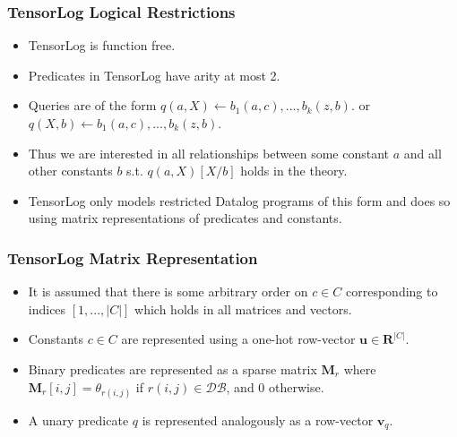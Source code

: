 \documentclass{beamer}
\begin{document}
\begin{frame}
\frametitle{TensorLog Logical Restrictions}
\begin{itemize}
	\item TensorLog is function free.
	\item Predicates in TensorLog have arity at most 2.
	\item Queries are of the form $q(a, X) \leftarrow b_1(a, c), ..., b_k(z, b).$ or $q(X, b) \leftarrow b_1(a, c), ..., b_k(z, b).$
	\item Thus we are interested in all relationships between some constant $a$ and all other constants $b$ s.t. $q(a, X)[X/b]$ holds in the theory.
	\item TensorLog only models restricted Datalog programs of this form and does so using matrix representations of predicates and constants.
\end{itemize}
\end{frame}

\begin{frame}
\frametitle{TensorLog Matrix Representation}
\begin{itemize}
	\item It is assumed that there is some arbitrary order on $c \in C$ corresponding to indices $[1, ..., |C|]$ which holds in all matrices and vectors.
	\item Constants $c \in C$ are represented using a one-hot row-vector $\textbf{u} \in \mathbf{R}^{|C|}$.
	\item Binary predicates are represented as a sparse matrix $\textbf{M}_r$ where $\textbf{M}_r[i, j] = \theta_{r(i, j)}$ if $r(i, j) \in \mathcal{DB}$, and 0 otherwise.
	\item  A unary predicate $q$ is represented analogously as a row-vector $\textbf{v}_q$.
\end{itemize}
\end{frame}
\end{document}
